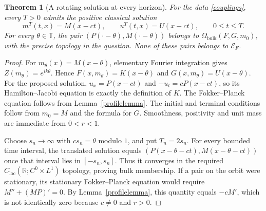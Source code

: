 \documentclass[11pt]{article}
\newtheorem{theorem}{Theorem}
\newcommand{\R}{\mathbb R}
\newcommand{\T}{\mathbb T}
\begin{document}
\begin{theorem}[A rotating solution at every horizon]\label{rotation}
For the data \eqref{couplings}, every $T>0$ admits the positive classical solution
\[
 m^T(t,x)=M(x-ct),\qquad u^T(t,x)=U(x-ct),\qquad 0\le t\le T.
\]
For every $\theta\in\T$, the pair $(P(\cdot-\theta),M(\cdot-\theta))$ belongs to $\Omega_{\mathrm{bulk}}(F,G,m_0)$, with the precise topology in the question. None of these pairs belongs to $\mathcal E_F$.
\end{theorem}
\begin{proof}
For $m_\theta(x)=M(x-\theta)$, elementary Fourier integration gives
$Z(m_\theta)=e^{ik\theta}$. Hence
$F(x,m_\theta)=K(x-\theta)$ and $G(x,m_\theta)=U(x-\theta)$.
For the proposed solution, $u_x=P(x-ct)$ and $-u_t=cP(x-ct)$, so its Hamilton--Jacobi equation is exactly the definition of $K$. The Fokker--Planck equation follows from Lemma~\ref{profilelemma}. The initial and terminal conditions follow from $m_0=M$ and the formula for $G$. Smoothness, positivity and unit mass are immediate from $0<r<1$.

Choose $s_n\to\infty$ with $cs_n=\theta$ modulo $1$, and put $T_n=2s_n$. For every bounded time interval, the translated solution equals
$(P(x-\theta-ct),M(x-\theta-ct))$ once that interval lies in $[-s_n,s_n]$. Thus it converges in the required $C_{\mathrm{loc}}(\R;C^0\times L^1)$ topology, proving bulk membership. If a pair on the orbit were stationary, its stationary Fokker--Planck equation would require $M''+(MP)'=0$. By Lemma~\ref{profilelemma}, this quantity equals $-cM'$, which is not identically zero because $c\ne0$ and $r>0$.
\end{proof}
\end{document}
